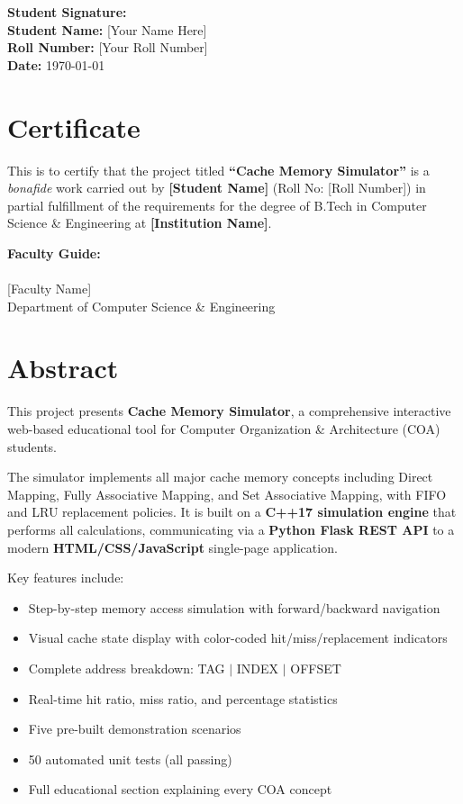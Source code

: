 \documentclass[12pt,a4paper]{report}
\begin{document}
\vspace{2cm}
\noindent\textbf{Student Signature:} \hrulefill\\[12pt]
\textbf{Student Name:} [Your Name Here]\\[8pt]
\textbf{Roll Number:}  [Your Roll Number]\\[8pt]
\textbf{Date:}         \today

\chapter*{Certificate}
This is to certify that the project titled \textbf{``Cache Memory Simulator''} is a
\textit{bonafide} work carried out by \textbf{[Student Name]} (Roll No: [Roll Number])
in partial fulfillment of the requirements for the degree of B.Tech in Computer Science
\& Engineering at \textbf{[Institution Name]}.

\vspace{2cm}
\noindent\textbf{Faculty Guide:}\\[1cm]
\hrulefill\\[6pt]
[Faculty Name]\\
Department of Computer Science \& Engineering\\
[Institution Name]

\chapter*{Abstract}
This project presents \textbf{Cache Memory Simulator}, a comprehensive interactive
web-based educational tool for Computer Organization \& Architecture (COA) students.

The simulator implements all major cache memory concepts including Direct Mapping,
Fully Associative Mapping, and Set Associative Mapping, with FIFO and LRU replacement
policies. It is built on a \textbf{C++17 simulation engine} that performs all calculations,
communicating via a \textbf{Python Flask REST API} to a modern \textbf{HTML/CSS/JavaScript}
single-page application.

Key features include:
\begin{itemize}
  \item Step-by-step memory access simulation with forward/backward navigation
  \item Visual cache state display with color-coded hit/miss/replacement indicators
  \item Complete address breakdown: TAG $|$ INDEX $|$ OFFSET
  \item Real-time hit ratio, miss ratio, and percentage statistics
  \item Five pre-built demonstration scenarios
  \item 50 automated unit tests (all passing)
  \item Full educational section explaining every COA concept
\end{itemize}
\end{document}
